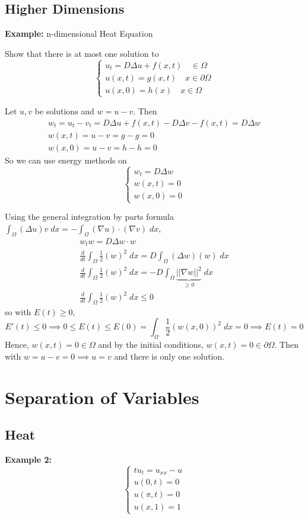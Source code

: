 \documentclass[10pt]{article}
\begin{document}
\subsection{Higher Dimensions}
\textbf{Example:} n-dimensional Heat Equation

Show that there is at most one solution to 
\[\begin{cases}
    u_t = D\Delta u + f(x, t) \quad \in \Omega\\
    u(x, t) = g(x, t) \quad x \in \partial \Omega\\
    u(x, 0) = h(x) \quad x\in \Omega
\end{cases}\]

Let $u, v$ be solutions and $w = u - v$. Then 
\begin{gather*}
    w_t = u_t - v_t = D\Delta u + f(x, t) - D\Delta v - f(x, t) = D\Delta w\\
    w(x, t) = u - v = g - g = 0\\
    w(x, 0) = u - v = h - h = 0
\end{gather*}
So we can use energy methods on 
\[\begin{cases}
    w_t = D\Delta w\\
    w(x, t) = 0\\
    w(x, 0) = 0
\end{cases}\]

Using the general integration by parts formula $\int_{\Omega} (\Delta u)v\; dx = -\int_{\Omega}(\nabla u) \cdot (\nabla v)\; dx$,
\begin{gather*}
    w_t w = D\Delta w \cdot w\\
    \frac{d}{dt}\int_{\Omega} \frac{1}{2}(w)^2\; dx = D\int_{\Omega} (\Delta w)(w) \; dx\\
    \frac{d}{dt}\int_{\Omega} \frac{1}{2}(w)^2\; dx = -D\int_{\Omega} \underbrace{||\nabla w||^2}_{\geq 0} \; dx\\
    \frac{d}{dt} \int_{\Omega}\frac{1}{2}(w)^2\; dx \leq 0
\end{gather*}
so with $E(t) \geq 0$,
\[E'(t) \leq 0 \implies 0 \leq E(t) \leq E(0) = \int_{\Omega}\frac{1}{2}(w(x, 0))^2\;dx = 0 \implies E(t) = 0\]
Hence, $w(x, t) = 0 \in \Omega$ and by the initial conditions, $w(x, t) = 0 \in \partial \Omega$. Then with 
$w = u - v = 0 \implies u = v$ and there is only one solution.

\section{Separation of Variables}
\subsection{Heat}
\textbf{Example 2:}
\[\begin{cases}
    tu_t = u_{xx} - u\\
    u(0, t) = 0\\
    u(\pi, t) = 0\\
    u(x, 1) = 1
\end{cases}\]
\end{document}
